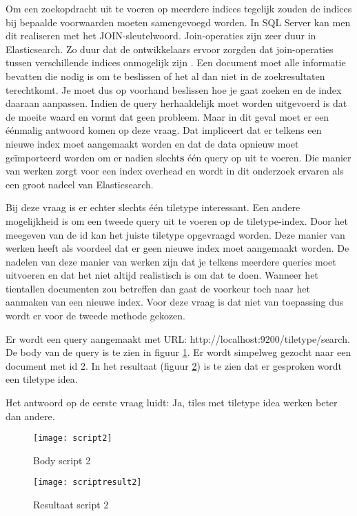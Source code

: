Om een zoekopdracht uit te voeren op meerdere indices tegelijk zouden de indices bij bepaalde voorwaarden moeten samengevoegd worden. In SQL Server kan men dit realiseren met het JOIN-sleutelwoord. Join-operaties zijn zeer duur in Elasticsearch. Zo duur dat de ontwikkelaars ervoor zorgden dat join-operaties tussen verschillende indices onmogelijk zijn \autocite{Elasticsearch}. Een document moet alle informatie bevatten die nodig is om te beslissen of het al dan niet in de zoekresultaten terechtkomt. Je moet dus op voorhand beslissen hoe je gaat zoeken en de index daaraan aanpassen. Indien de query herhaaldelijk moet worden uitgevoerd is dat de moeite waard en vormt dat geen probleem. Maar in dit geval moet er een  éénmalig antwoord komen op deze vraag. Dat impliceert dat er telkens een nieuwe index moet aangemaakt worden en dat de data opnieuw moet geïmporteerd worden om er nadien slecht\textbf{s} één query op uit te voeren. Die manier van werken zorgt voor een index overhead en wordt in dit onderzoek ervaren als een groot nadeel van Elasticsearch.

Bij deze vraag is er echter slechts één tiletype interessant. Een andere mogelijkheid is om een tweede query uit te voeren op de tiletype-index. Door het meegeven van de id kan het juiste tiletype opgevraagd worden. Deze manier van werken heeft als voordeel dat er geen nieuwe index moet aangemaakt worden. De nadelen van deze manier van werken zijn dat je telkens meerdere queries moet uitvoeren en dat het niet altijd realistisch is om dat te doen. Wanneer het tientallen documenten zou betreffen dan gaat de voorkeur toch naar het aanmaken van een nieuwe index. Voor deze vraag is dat niet van toepassing dus wordt er voor de tweede methode gekozen.

Er wordt een query aangemaakt met URL: http://localhost:9200/tiletype/\textunderscore search. De body van de query is te zien in figuur \ref{fig:script2}. Er wordt simpelweg gezocht naar een document met id 2. In het resultaat (figuur \ref{fig:scriptresult2}) is te zien dat er gesproken wordt een tiletype idea.

Het antwoord op de eerste vraag luidt: Ja, tiles met tiletype idea werken beter dan andere.

\begin{figure}
	\centering
	\texttt{[image: script2]}
	\caption{Body script 2}
	\label{fig:script2}
\end{figure}

\begin{figure}
	\centering
	\texttt{[image: scriptresult2]}
	\caption{Resultaat script 2}
	\label{fig:scriptresult2}
\end{figure}

